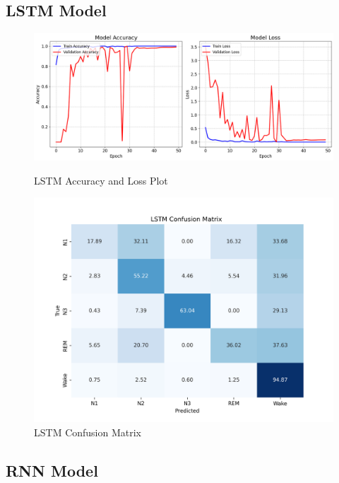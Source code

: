 \subsection{LSTM Model}

\begin{figure}[H]
	\centering
	\begin{minipage}{0.66\textwidth}
		\centering
		\includegraphics[width=\linewidth]{img/paper_2/lstm accuracy and loss plot.png}
		\caption{LSTM Accuracy and Loss Plot}
		\label{fig:lstm_accuracy}
	\end{minipage}
	\hfill
	\begin{minipage}{0.32\textwidth}
		\centering
		\includegraphics[width=\linewidth]{img/paper_2/LSTM_cm.png}
		\caption{LSTM Confusion Matrix}
		\label{fig:lstm_cm}
	\end{minipage}
\end{figure}


\subsection{RNN Model}

